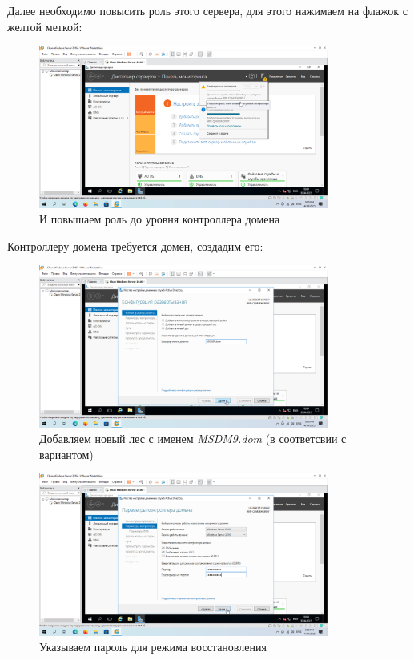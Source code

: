 \documentclass[a4paper]{article}
\begin{document}
  Далее необходимо повысить роль этого сервера, для этого нажимаем на флажок с желтой меткой:

  \begin{figure}[H]
    \centering
    \includegraphics[width=0.85\textwidth]{Screenshot_51}
    \caption{И повышаем роль до уровня контроллера домена}
    \label{img:51}
  \end{figure}

  Контроллеру домена требуется домен, создадим его:

  \begin{figure}[H]
    \centering
    \includegraphics[width=0.85\textwidth]{Screenshot_52}
    \caption{Добавляем новый лес с именем \textit{MSDM9.dom} (в соответсвии с вариантом)}
    \label{img:52}
  \end{figure}

  \begin{figure}[H]
    \centering
    \includegraphics[width=0.85\textwidth]{Screenshot_53}
    \caption{Указываем пароль для режима восстановления}
    \label{img:53}
  \end{figure}
\end{document}
